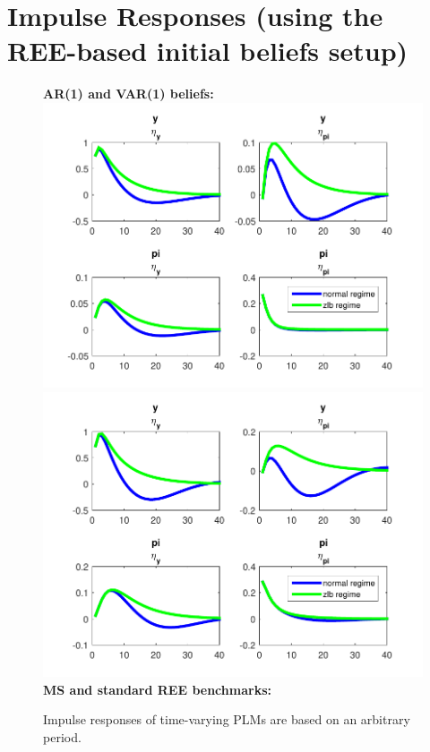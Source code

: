 \documentclass[12pt,reqno]{article}
\numberwithin{equation}{section}
\begin{document}
\section*{Impulse Responses (using the REE-based initial beliefs setup)}

\begin{figure}[H]
\caption{Impulse responses of time-varying PLMs are based on an arbitrary period.}
\textbf{AR(1) and VAR(1) beliefs:}\\
\includegraphics[scale=0.6]{NKPC_ree_init_AR1_IR.pdf}
\includegraphics[scale=0.6]{NKPC_ree_init_VAR_IR.pdf}\\

\textbf{MS and standard REE benchmarks: }\\


\end{figure}
\end{document}
